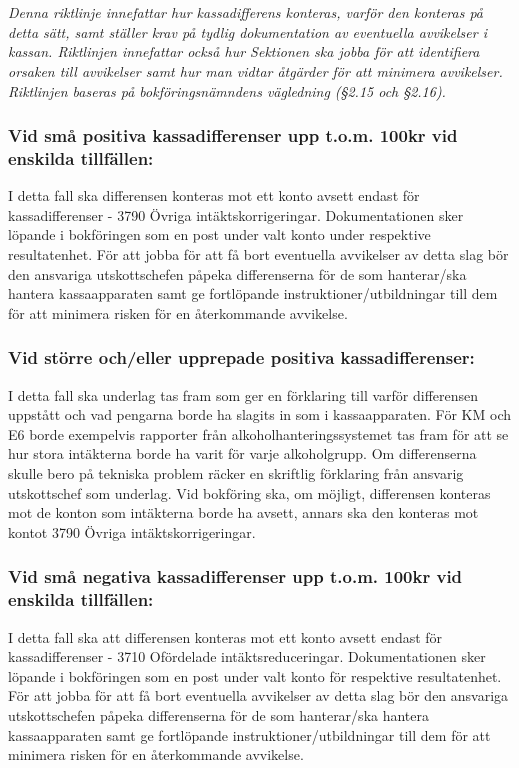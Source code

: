 \documentclass[10pt]{article}
\begin{document}
\section*{\doctitle}
\emph{Denna riktlinje innefattar hur kassadifferens konteras, varför den konteras på detta sätt, samt ställer krav på tydlig dokumentation av eventuella avvikelser i kassan. Riktlinjen innefattar också hur Sektionen ska jobba för att identifiera orsaken till avvikelser samt hur man vidtar åtgärder för att minimera avvikelser. Riktlinjen baseras på bokföringsnämndens vägledning (\S2.15 och \S2.16).}

\subsubsection*{Vid små positiva kassadifferenser upp t.o.m. 100kr vid enskilda tillfällen:}
I detta fall ska differensen konteras mot ett konto avsett endast för kassadifferenser - 3790 Övriga intäktskorrigeringar.
Dokumentationen sker löpande i bokföringen som en post under valt konto under respektive resultatenhet.
För att jobba för att få bort eventuella avvikelser av detta slag bör den ansvariga utskottschefen påpeka differenserna för de som hanterar/ska hantera kassaapparaten samt ge fortlöpande instruktioner/utbildningar till dem för att minimera risken för en återkommande avvikelse.

\subsubsection*{Vid större och/eller upprepade positiva kassadifferenser:}
I detta fall ska underlag tas fram som ger en förklaring till varför differensen uppstått och vad pengarna borde ha slagits in som i kassaapparaten.
För KM och E6 borde exempelvis rapporter från alkoholhanteringssystemet tas fram för att se hur stora intäkterna borde ha varit för varje alkoholgrupp.
Om differenserna skulle bero på tekniska problem räcker en skriftlig förklaring från ansvarig utskottschef som underlag.
Vid bokföring ska, om möjligt, differensen konteras mot de konton som intäkterna borde ha avsett, annars ska den konteras mot kontot 3790 Övriga intäktskorrigeringar.

\subsubsection*{Vid små negativa kassadifferenser upp t.o.m. 100kr vid enskilda tillfällen:}
I detta fall ska att differensen konteras mot ett konto avsett endast för kassadifferenser - 3710 Ofördelade intäktsreduceringar.
Dokumentationen sker löpande i bokföringen som en post under valt konto för respektive resultatenhet.
För att jobba för att få bort eventuella avvikelser av detta slag bör den ansvariga utskottschefen påpeka differenserna för de som hanterar/ska hantera kassaapparaten samt ge fortlöpande instruktioner/utbildningar till dem för att minimera risken för en återkommande avvikelse.
\end{document}
